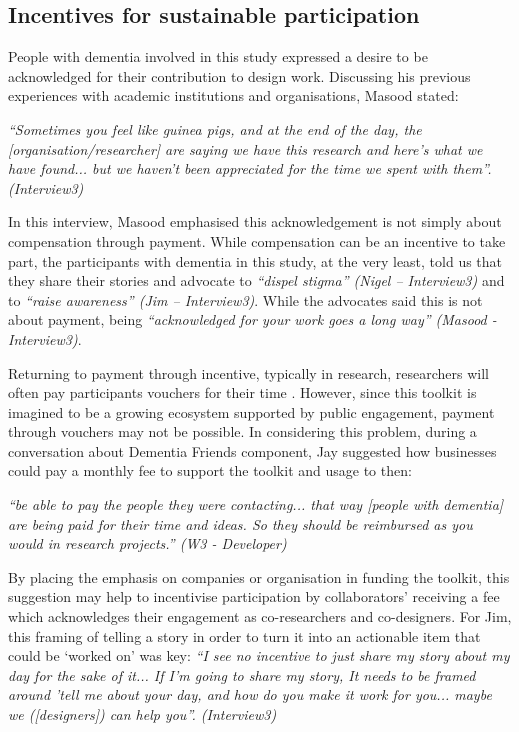 \subsection{Incentives for sustainable participation}
People with dementia involved in this study expressed a desire to be acknowledged for their contribution to design work. Discussing his previous experiences with academic institutions and organisations, Masood stated:

\textit{``Sometimes you feel like guinea pigs, and at the end of the day, the [organisation/researcher] are saying we have this research and here's what we have found... but we haven't been appreciated for the time we spent with them''. (Interview3)}

In this interview, Masood emphasised this acknowledgement is not simply about compensation through payment. While compensation can be an incentive to take part, the participants with dementia in this study, at the very least, told us that they share their stories and advocate to \textit{``dispel stigma'' (Nigel – Interview3)} and to \textit{``raise awareness'' (Jim – Interview3)}. While the advocates said this is not about payment, being \textit{``acknowledged for your work goes a long way'' (Masood - Interview3)}. 

Returning to payment through incentive, typically in research, researchers will often pay participants vouchers for their time \citep{hodge_relational_2020}. However, since this toolkit is imagined to be a growing ecosystem supported by public engagement, payment through vouchers may not be possible. In considering this problem, during a conversation about Dementia Friends component, Jay suggested how businesses could pay a monthly fee to support the toolkit and usage to then:

\textit{``be able to pay the people they were contacting... that way [people with dementia] are being paid for their time and ideas. So they should be reimbursed as you would in research projects.'' (W3 - Developer)}

By placing the emphasis on companies or organisation in funding the toolkit, this suggestion may help to incentivise participation by collaborators’ receiving a fee which acknowledges their engagement as co-researchers and co-designers. For Jim, this framing of telling a story in order to turn it into an actionable item that could be ‘worked on’ was key: 
\textit{ ``I see no incentive to just share my story about my day for the sake of it... If I'm going to share my story, It needs to be framed around 'tell me about your day, and how do you make it work for you... maybe we ([designers]) can help you''. (Interview3)}
 
